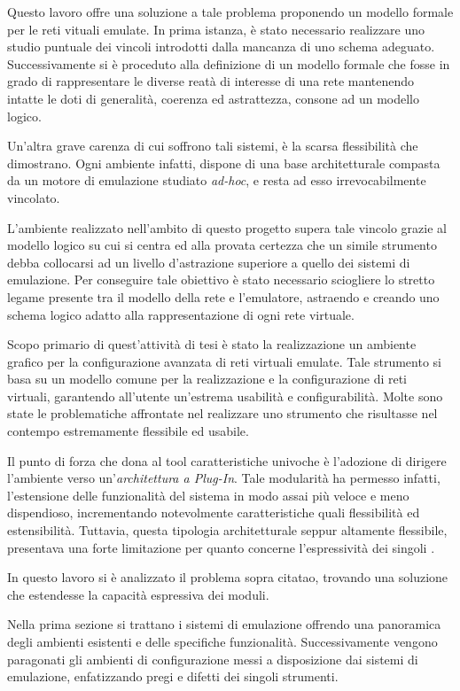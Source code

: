 Questo lavoro offre una soluzione a tale problema proponendo un modello formale per le reti vituali emulate.
In prima istanza, è stato necessario realizzare uno studio puntuale dei vincoli introdotti dalla mancanza di uno schema adeguato. Successivamente si è proceduto alla definizione di un modello formale che fosse in grado di rappresentare le diverse reatà di interesse di una rete mantenendo intatte le doti di generalità, coerenza ed astrattezza, consone ad un modello logico.

Un'altra grave carenza di cui soffrono tali sistemi, è la scarsa flessibilità che dimostrano. Ogni ambiente infatti, dispone di una base architetturale compasta da un motore di emulazione studiato \emph{ad-hoc}, e resta ad esso irrevocabilmente vincolato.

L'ambiente realizzato nell'ambito di questo progetto supera tale vincolo grazie al modello logico su cui si centra ed alla provata certezza che un simile strumento debba collocarsi ad un livello d'astrazione superiore a quello dei sistemi di emulazione.
Per conseguire tale obiettivo è stato necessario sciogliere lo stretto legame presente tra il modello della rete e l'emulatore, astraendo e creando uno schema logico adatto alla rappresentazione di ogni rete virtuale.

Scopo primario di quest'attività di tesi è stato la realizzazione un ambiente grafico per la configurazione avanzata di reti virtuali emulate.
Tale strumento si basa su un modello comune per la realizzazione e la configurazione di reti virtuali, garantendo all'utente un'estrema usabilità e configurabilità.
Molte sono state le problematiche affrontate nel realizzare uno strumento che risultasse nel contempo estremamente flessibile ed usabile.

Il punto di forza che dona al tool caratteristiche univoche è l'adozione di dirigere l'ambiente verso un'\emph{architettura a Plug-In}. Tale modularità ha permesso infatti, l'estensione delle funzionalità del sistema in modo assai più veloce e meno dispendioso, incrementando notevolmente caratteristiche quali flessibilità ed estensibilità.
Tuttavia, questa tipologia architetturale seppur altamente flessibile, presentava una forte limitazione per quanto concerne l'espressività dei singoli \plugin{}. 

In questo lavoro si è analizzato il problema sopra citatao, trovando una soluzione che estendesse la capacità espressiva dei moduli.


Nella prima sezione si trattano i sistemi di emulazione offrendo una panoramica degli ambienti esistenti e delle specifiche funzionalità. Successivamente vengono paragonati gli ambienti di configurazione messi a disposizione dai sistemi di emulazione, enfatizzando pregi e difetti dei singoli strumenti.

